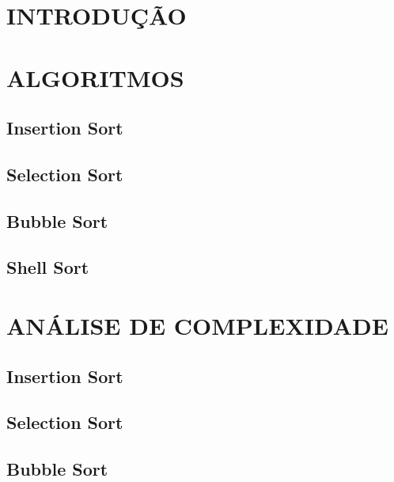 \documentclass[12pt,arial]{article}
\begin{document}
		\tableofcontents
		\newpage

		\section{INTRODUÇÃO}
		
		\newpage

            \section{ALGORITMOS}
		\subsection{Insertion Sort}
		
		\newpage

		\subsection{Selection Sort}
		
		\newpage

		\subsection{Bubble Sort}
		
		\newpage

		\subsection{Shell Sort}
		
		\newpage

            \section{ANÁLISE DE COMPLEXIDADE}
		\subsection{Insertion Sort}
		
	    \newpage

		\subsection{Selection Sort}
		
	    \newpage

		\subsection{Bubble Sort}
		
	    \newpage
\end{document}
